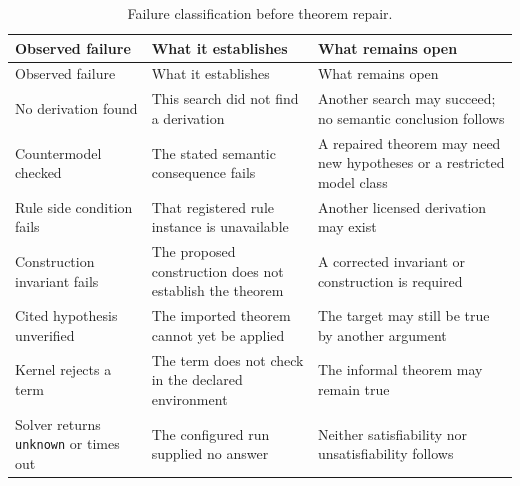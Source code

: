 \begin{longtable}{@{}p{}p{}p{}@{}}
\caption{Failure classification before theorem repair.}
\label{tab:p12-failure-classification}\\
\toprule
Observed failure & What it establishes & What remains open \\ \midrule
\endfirsthead
\toprule
Observed failure & What it establishes & What remains open \\ \midrule
\endhead
No derivation found & This search did not find a derivation & Another search
may succeed; no semantic conclusion follows \\ \addlinespace
Countermodel checked & The stated semantic consequence fails & A repaired
theorem may need new hypotheses or a restricted model class \\ \addlinespace
Rule side condition fails & That registered rule instance is unavailable &
Another licensed derivation may exist \\ \addlinespace
Construction invariant fails & The proposed construction does not establish
the theorem & A corrected invariant or construction is required \\ \addlinespace
Cited hypothesis unverified & The imported theorem cannot yet be applied &
The target may still be true by another argument \\ \addlinespace
Kernel rejects a term & The term does not check in the declared environment &
The informal theorem may remain true \\ \addlinespace
Solver returns \texttt{unknown} or times out & The configured run supplied no
answer & Neither satisfiability nor unsatisfiability follows \\
\bottomrule
\end{longtable}

